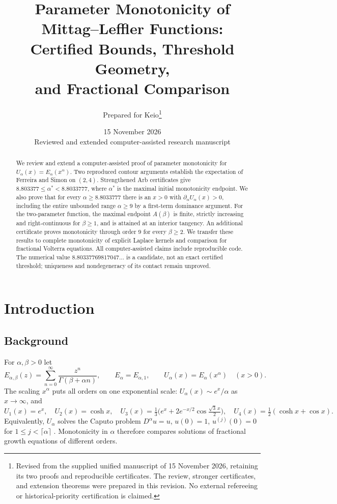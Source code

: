 \documentclass[11pt,a4paper]{article}
\title{\color{navy}Parameter Monotonicity of Mittag--Leffler Functions:\\
Certified Bounds, Threshold Geometry,\\ and Fractional Comparison}
\author{Prepared for Keio\thanks{Revised from the supplied unified manuscript of
15 November 2026, retaining its two proofs and reproducible certificates.
The review, stronger certificates, and extension theorems were prepared in this
revision. No external refereeing or historical-priority certification is claimed.}}
\date{15 November 2026\\\small Reviewed and extended computer-assisted research manuscript}
\theoremstyle{plain}
\theoremstyle{remark}
\begin{document}
\maketitle

\begin{abstract}
We review and extend a computer-assisted proof of parameter monotonicity for
$U_\alpha(x)=E_\alpha(x^\alpha)$. Two reproduced contour arguments establish
the expectation of Ferreira and Simon on $(2,4)$. Strengthened Arb certificates give
$8.803377\le\alpha^*<8.8033777$, where $\alpha^*$ is the maximal initial
monotonicity endpoint. We also prove that for every $\alpha\ge8.8033777$ there is
an $x>0$ with $\partial_\alpha U_\alpha(x)>0$, including the entire unbounded
range $\alpha\ge9$ by a first-term dominance argument. For the two-parameter
function, the maximal endpoint $A(\beta)$ is finite, strictly increasing and
right-continuous for $\beta\ge1$, and is attained at an interior tangency.
An additional certificate proves monotonicity through order $9$ for every
$\beta\ge2$. We transfer these results to complete monotonicity of explicit
Laplace kernels and comparison for fractional Volterra equations.
All computer-assisted claims include reproducible code. The numerical value
$8.80337769817047\ldots$ is a candidate, not an exact certified threshold;
uniqueness and nondegeneracy of its contact remain unproved.
\end{abstract}

\tableofcontents

\section{Introduction}\label{sec:intro}
\subsection{Background}
For $\alpha,\beta>0$ let
\[
 E_{\alpha,\beta}(z)=\sum_{n=0}^{\infty}\frac{z^n}{\Gamma(\beta+\alpha n)},\qquad
 E_\alpha=E_{\alpha,1},\qquad U_\alpha(x)=E_\alpha(x^\alpha)\quad(x>0).
\]
The scaling $x^\alpha$ puts all orders on one exponential scale: $U_\alpha(x)\sim e^x/\alpha$
as $x\to\infty$, and
\[
 U_1(x)=e^x,\quad U_2(x)=\cosh x,\quad
 U_3(x)=\tfrac13\bigl(e^x+2e^{-x/2}\cos\tfrac{\sqrt3\,x}{2}\bigr),\quad
 U_4(x)=\tfrac12(\cosh x+\cos x).
\]
Equivalently, $U_\alpha$ solves the Caputo problem $D^\alpha u=u$, $u(0)=1$,
$u^{(j)}(0)=0$ for $1\le j<\lceil\alpha\rceil$ \cite{GKMR}. Monotonicity in $\alpha$ therefore
compares solutions of fractional growth equations of different orders.
\end{document}
